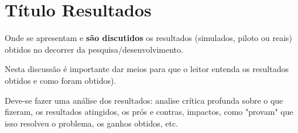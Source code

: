 \chapter{Título Resultados}
Onde se apresentam e \textbf{são discutidos} os resultados (simulados, piloto ou reais) obtidos no decorrer da pesquisa/desenvolvimento. 

Nesta discussão é importante dar meios para que o leitor entenda os resultados obtidos e como foram obtidos).

Deve-se fazer uma análise dos resultados: analise crítica profunda sobre o que fizeram, os resultados atingidos, os prós e contras, impactos, como "provam" que isso resolveu o problema, os ganhos obtidos, etc.
